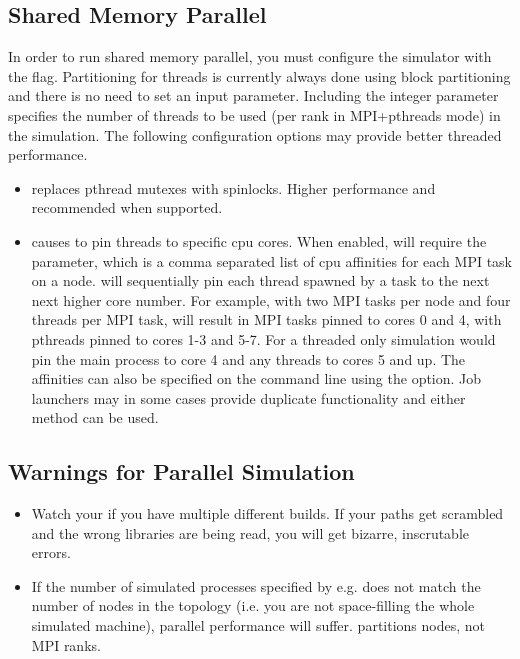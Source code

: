 \subsection{Shared Memory Parallel}
\label{subsec:parallelopt}
In order to run shared memory parallel, you must configure the simulator with the  flag.
Partitioning for threads is currently always done using block partitioning and there is no need to set an input parameter.
Including the integer parameter  specifies the number of threads to be used (per rank in MPI+pthreads mode) in the simulation.
The following configuration options may provide better threaded performance.
\begin{itemize}
\item{} replaces pthread mutexes with spinlocks.  Higher performance and recommended when supported.
\item{} causes \sstmacro to pin threads to specific cpu cores.  When enabled, \sstmacro will require the
 parameter, which is a comma separated list of cpu affinities for each MPI task on a node.  \sstmacro will sequentially
pin each thread spawned by a task to the next next higher core number.  For example, with two MPI tasks per node and four threads per MPI task,
 will result in MPI tasks pinned to cores 0 and 4, with pthreads pinned to cores 1-3 and 5-7.
For a threaded only simulation  would pin the main process to core 4 and any threads to cores 5 and up.
The affinities can also be specified on the command line using the  option.
Job launchers may in some cases provide duplicate functionality and either method can be used.
\end{itemize}

\subsection{Warnings for Parallel Simulation}
\label{subsec:parallelwarn}
\begin{itemize}
\item Watch your  if you have multiple different builds. If your paths get scrambled and the wrong libraries are being read, you will get bizarre, inscrutable errors.
\item If the number of simulated processes specified by e.g.  does not match the number of nodes in the topology (i.e. you are not space-filling the whole simulated machine), parallel performance will suffer. \sstmacro partitions nodes, not MPI ranks.
\end{itemize}


